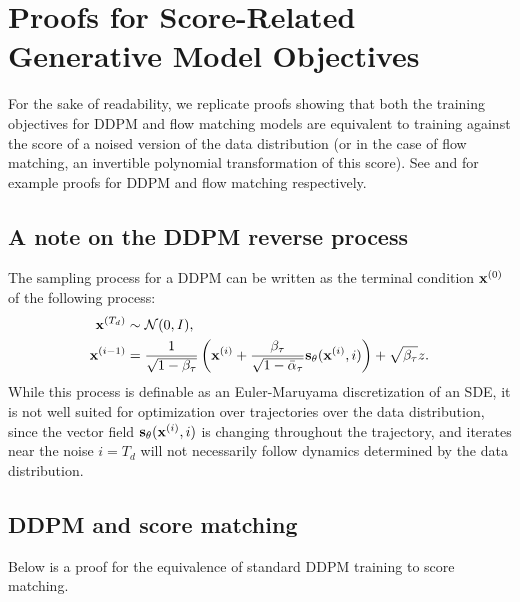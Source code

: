 \section{Proofs for Score-Related Generative Model Objectives}
\label{sec:proof_diffusion}
For the sake of readability, we replicate proofs showing that both the training objectives for DDPM and flow matching models are equivalent to training against the score of a noised version of the data distribution (or in the case of flow matching, an invertible polynomial transformation of this score). See \citet{vincent2011connection} and \citet{lipman2024flow} for example proofs for DDPM and flow matching respectively.

\subsection{A note on the DDPM reverse process}\label{sec:ddpm_sampling}

The sampling process for a DDPM can be written as the terminal condition $\mathbf{x}^{(0)}$ of the following process:
\begin{align}
    \mathbf{x}^{(T_d)} &\sim \mathcal N(0, I),\\
    \mathbf{x}^{(i - 1)} &= \frac{1}{\sqrt{1-\beta_\tau}}\left(\mathbf{x}^{(i)} + \frac{\beta_\tau}{\sqrt{1 - \bar{\alpha}_\tau}} \mathbf{s}_\theta(\mathbf{x}^{(i)}, i)\right) + \sqrt{\beta_\tau} z.
\end{align}
While this process is definable as an Euler-Maruyama discretization of an SDE, it is not well suited for optimization over trajectories over the data distribution, since the vector field $\mathbf{s}_\theta(\mathbf{x}^{(i)}, i)$ is changing throughout the trajectory, and iterates near the noise $i=T_d$ will not necessarily follow dynamics determined by the data distribution.


\subsection{DDPM and score matching}\label{sec:ddpm_score_proof}

Below is a proof for the equivalence of standard DDPM training to score matching.

